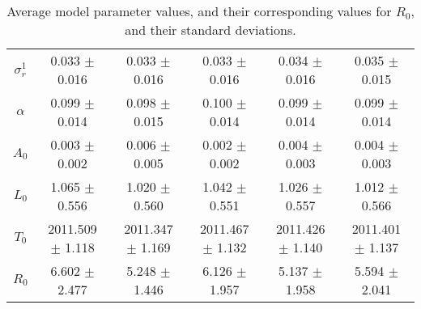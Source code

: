 \begin{sidewaystable}
\begin{tabular}{cccccc}
{\bf $\sigma^1_r$} & 0.033 $\pm$ 0.016 & 0.033 $\pm$ 0.016 & 0.033 $\pm$ 0.016 & 0.034 $\pm$ 0.016 & 0.035 $\pm$ 0.015 \\
{\bf $\alpha$} & 0.099 $\pm$ 0.014 & 0.098 $\pm$ 0.015 & 0.100 $\pm$ 0.014 & 0.099 $\pm$ 0.014 & 0.099 $\pm$ 0.014 \\
{\bf $A_0$} & 0.003 $\pm$ 0.002 & 0.006 $\pm$ 0.005 & 0.002 $\pm$ 0.002 & 0.004 $\pm$ 0.003 & 0.004 $\pm$ 0.003 \\
{\bf $L_0$} & 1.065 $\pm$ 0.556 & 1.020 $\pm$ 0.560 & 1.042 $\pm$ 0.551 & 1.026 $\pm$ 0.557 & 1.012 $\pm$ 0.566 \\
{\bf $T_0$} & 2011.509 $\pm$ 1.118 & 2011.347 $\pm$ 1.169 & 2011.467 $\pm$ 1.132 & 2011.426 $\pm$ 1.140 & 2011.401 $\pm$ 1.137 \\
{\bf $R_0$} & 6.602 $\pm$ 2.477& 5.248 $\pm$ 1.446& 6.126 $\pm$ 1.957& 5.137 $\pm$ 1.958& 5.594 $\pm$ 2.041\\
\hline\hline
\end{tabular}
\caption{Average model parameter values, and their corresponding values for $R_0$,  and their standard deviations.}
\label{Table:Parameter_Values}
\end{sidewaystable}

